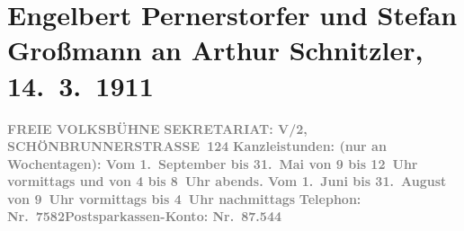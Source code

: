 

         \renewcommand{\erwaehnteInstitutionen}{Institutionen: Wiener Freie Volksbühne}
         \renewcommand{\erwaehnteOrte}{Orte: Schönbrunnerstraße, Wien}
         \renewcommand{\erwaehnteWerke}{Werke: Der Strom. Organ der Wiener Freien Volksbühne}
               \section[Engelbert Pernerstorfer und Stefan Großmann an Arthur Schnitzler, 14. 3. 1911]{ Engelbert Pernerstorfer und Stefan Großmann an Arthur Schnitzler,
               14. 3. 1911}\nopagebreak{}\rehead{ }\begin{ledgroupsized}[t]{13cm}\normalsize\beginnumbering \toendnotes[C]{\smallbreak\pagebreak[2]} 
\toendnotes[C]{\smallbreak}\pstart
           \noindent{}{\pb}\textcolor{gray}{\textbf{FREIE VOLKSBÜHNE}}\pend
           \pstart
           \textcolor{gray}{\textbf{SEKRETARIAT: V/2,
                           SCHÖNBRUNNERSTRASSE 124}}\pend
           \pstart
           \textcolor{gray}{\textbf{Kanzleistunden: (nur an Wochentagen): Vom 1. September bis
                     31. Mai von 9 bis 12 Uhr vormittags und von 4 bis 8 Uhr abends. Vom 1. Juni bis
                     31. August von 9 Uhr vormittags bis 4 Uhr nachmittags}}\pend
           \pstart
           \textcolor{gray}{\textbf{Telephon: Nr. 7582}}\hfill \textcolor{gray}{\textbf{Postsparkassen-Konto: Nr. 87.544}}\pend
           \pstart

\end{ledgroupsized}
